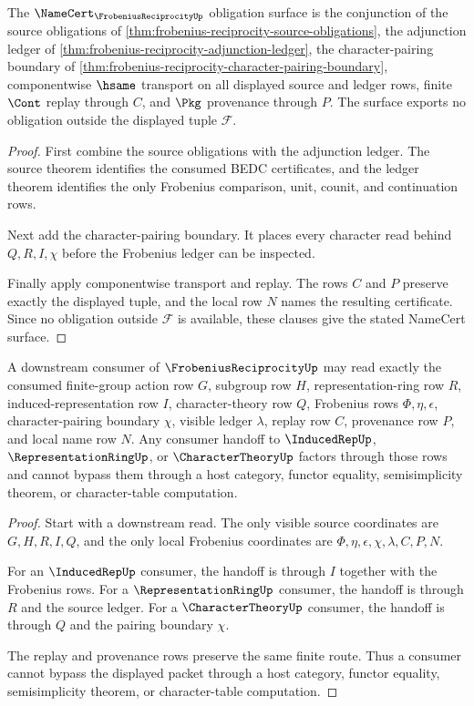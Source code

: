 \begin{theorem}\label{thm:frobenius-reciprocity-namecert-surface}
The $\NameCert_{\FrobeniusReciprocityUp}$ obligation surface is the conjunction of the source obligations of \autoref{thm:frobenius-reciprocity-source-obligations}, the adjunction ledger of \autoref{thm:frobenius-reciprocity-adjunction-ledger}, the character-pairing boundary of \autoref{thm:frobenius-reciprocity-character-pairing-boundary}, componentwise $\hsame$ transport on all displayed source and ledger rows, finite $\Cont$ replay through $C$, and $\Pkg$ provenance through $P$. The surface exports no obligation outside the displayed tuple $\mathcal{F}$.
\end{theorem}
\begin{proof}
First combine the source obligations with the adjunction ledger. The source theorem identifies the consumed BEDC certificates, and the ledger theorem identifies the only Frobenius comparison, unit, counit, and continuation rows.

Next add the character-pairing boundary. It places every character read behind $Q,R,I,\chi$ before the Frobenius ledger can be inspected.

Finally apply componentwise transport and replay. The rows $C$ and $P$ preserve exactly the displayed tuple, and the local row $N$ names the resulting certificate. Since no obligation outside $\mathcal{F}$ is available, these clauses give the stated NameCert surface.
\end{proof}

\begin{theorem}\label{thm:frobenius-reciprocity-consumer-handoff}
A downstream consumer of $\FrobeniusReciprocityUp$ may read exactly the consumed finite-group action row $G$, subgroup row $H$, representation-ring row $R$, induced-representation row $I$, character-theory row $Q$, Frobenius rows $\Phi,\eta,\epsilon$, character-pairing boundary $\chi$, visible ledger $\lambda$, replay row $C$, provenance row $P$, and local name row $N$. Any consumer handoff to $\InducedRepUp$, $\RepresentationRingUp$, or $\CharacterTheoryUp$ factors through those rows and cannot bypass them through a host category, functor equality, semisimplicity theorem, or character-table computation.
\end{theorem}
\begin{proof}
Start with a downstream read. The only visible source coordinates are $G,H,R,I,Q$, and the only local Frobenius coordinates are $\Phi,\eta,\epsilon,\chi,\lambda,C,P,N$.

For an $\InducedRepUp$ consumer, the handoff is through $I$ together with the Frobenius rows. For a $\RepresentationRingUp$ consumer, the handoff is through $R$ and the source ledger. For a $\CharacterTheoryUp$ consumer, the handoff is through $Q$ and the pairing boundary $\chi$.

The replay and provenance rows preserve the same finite route. Thus a consumer cannot bypass the displayed packet through a host category, functor equality, semisimplicity theorem, or character-table computation.
\end{proof}

